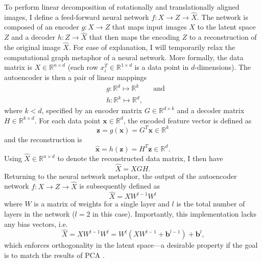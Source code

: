 \documentclass[11pt,a4paper,oneside]{article}
\begin{document}
\begin{appendices}
\par
To perform linear decomposition of rotationally and translationally aligned images, I define a feed-forward neural network $f: X \to Z \to \hat{X}$. The network is composed of an encoder $g: X \to Z$ that maps input images $X$ to the latent space $Z$ and a decoder $h: Z \to \hat{X}$ that then maps the encoding $Z$ to a reconstruction of the original image $\hat{X}$. For ease of explanation, I will temporarily relax the computational graph metaphor of a neural network. More formally, the data matrix is $X \in \mathbb{R}^{n \times d}$ (each row $x_i^{T} \in \mathbb{R}^{1 \times d}$ is a data point in $d$-dimensions). The autoencoder is then a pair of linear mappings
\begin{align}
& g: \mathbb{R}^d \mapsto \mathbb{R}^k \qquad  \text{and}\\
& h: \mathbb{R}^k \mapsto \mathbb{R}^d \text{,}
\end{align}
where $k < d$, specified by an encoder matrix $G \in \mathbb{R}^{d \times k}$ and a decoder matrix $H \in \mathbb{R}^{k \times d}	$. For each data point $\mathbf{x} \in \mathbb{R}^d$, the encoded feature vector is defined as
\begin{equation}
\mathbf{z} = g(\mathbf{x}) = G^{T}\mathbf{x} \in \mathbb{R}^k
\end{equation}
and the reconstruction is
\begin{equation}
\mathbf{\hat{x}} = h(\mathbf{z}) = H^{T}\mathbf{z} \in \mathbb{R}^d \text{.}
\end{equation}
Using $\hat{X} \in \mathbb{R}^{n \times d}$ to denote the reconstructed data matrix, I then have
\begin{equation}
\hat{X} = XGH \text{.}
\end{equation}
Returning to the neural network metaphor, the output of the autoencoder network $f: X \to Z \to \hat{X}$ is subsequently defined as
\begin{equation}
\hat{X} = XW^{l-1}W^l
\end{equation}
where $W$ is a matrix of weights for a single layer and $l$ is the total number of layers in the network ($l=2$ in this case).
Importantly, this implementation lacks any bias vectors, i.e.
\begin{equation}
\hat{X} = XW^{l-1}W^l = W^l(XW^{l-1}+\mathbf{b}^{l-1}) + \mathbf{b}^{l} \text{,}
\end{equation}
which enforces orthogonality in the latent space---a desirable property if the goal is to match the results of PCA \citep{konda2014zero}. 

\end{appendices}
\end{document}
